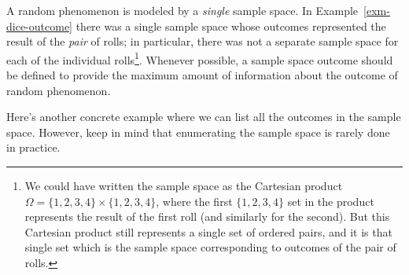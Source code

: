 \documentclass[
  letterpaper,
  DIV=11,
  numbers=noendperiod]{scrreprt}
\theoremstyle{plain}
\theoremstyle{definition}
\theoremstyle{definition}
\theoremstyle{definition}
\theoremstyle{remark}
\begin{document}
\begin{table}

\caption{\label{tbl-dice-outcome}Table representing the sample space of
two rolls of a four-sided die. Each row represents an outcome.}


\end{table}%

A random phenomenon is modeled by a \emph{single} sample space. In
Example~\ref{exm-dice-outcome} there was a single sample space whose
outcomes represented the result of the \emph{pair} of rolls; in
particular, there was not a separate sample space for each of the
individual rolls\footnote{We could have written the sample space as the
  Cartesian product \(\Omega = \{1, 2, 3, 4\} \times\{1, 2, 3, 4\}\),
  where the first \(\{1, 2, 3, 4\}\) set in the product represents the
  result of the first roll (and similarly for the second). But this
  Cartesian product still represents a single set of ordered pairs, and
  it is that single set which is the sample space corresponding to
  outcomes of the pair of rolls.}. Whenever possible, a sample space
outcome should be defined to provide the maximum amount of information
about the outcome of random phenomenon.

Here's another concrete example where we can list all the outcomes in
the sample space. However, keep in mind that enumerating the sample
space is rarely done in practice.
\end{document}
